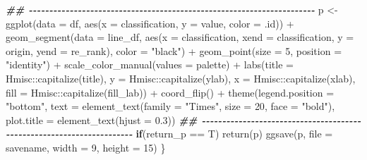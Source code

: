 \documentclass[
]{article}
\newenvironment{Shaded}{\begin{snugshade}}{\end{snugshade}}
\newcommand{\AttributeTok}[1]{\textcolor[rgb]{0.77,0.63,0.00}{#1}}
\newcommand{\ControlFlowTok}[1]{\textcolor[rgb]{0.13,0.29,0.53}{\textbf{#1}}}
\newcommand{\DecValTok}[1]{\textcolor[rgb]{0.00,0.00,0.81}{#1}}
\newcommand{\DocumentationTok}[1]{\textcolor[rgb]{0.56,0.35,0.01}{\textbf{\textit{#1}}}}
\newcommand{\FloatTok}[1]{\textcolor[rgb]{0.00,0.00,0.81}{#1}}
\newcommand{\FunctionTok}[1]{\textcolor[rgb]{0.00,0.00,0.00}{#1}}
\newcommand{\NormalTok}[1]{#1}
\newcommand{\OtherTok}[1]{\textcolor[rgb]{0.56,0.35,0.01}{#1}}
\newcommand{\SpecialCharTok}[1]{\textcolor[rgb]{0.00,0.00,0.00}{#1}}
\newcommand{\StringTok}[1]{\textcolor[rgb]{0.31,0.60,0.02}{#1}}
\begin{document}
\begin{Shaded}
\begin{Highlighting}[]
    \DocumentationTok{\#\# {-}{-}{-}{-}{-}{-}{-}{-}{-}{-}{-}{-}{-}{-}{-}{-}{-}{-}{-}{-}{-}{-}{-}{-}{-}{-}{-}{-}{-}{-}{-}{-}{-}{-}{-}{-}{-}{-}{-}{-}{-}{-}{-}{-}{-}{-}{-}{-}{-}{-}{-}{-}{-}{-}{-}{-}{-}{-}{-}{-}{-}{-}{-}{-}{-}{-}{-}{-}{-}{-} }
\NormalTok{    p }\OtherTok{\textless{}{-}} \FunctionTok{ggplot}\NormalTok{(}\AttributeTok{data =}\NormalTok{ df,}
                \FunctionTok{aes}\NormalTok{(}\AttributeTok{x =}\NormalTok{ classification,}
                    \AttributeTok{y =}\NormalTok{ value,}
                    \AttributeTok{color =}\NormalTok{ .id)) }\SpecialCharTok{+}
      \FunctionTok{geom\_segment}\NormalTok{(}\AttributeTok{data =}\NormalTok{ line\_df, }\FunctionTok{aes}\NormalTok{(}\AttributeTok{x =}\NormalTok{ classification, }\AttributeTok{xend =}\NormalTok{ classification, }\AttributeTok{y =}\NormalTok{ origin, }\AttributeTok{yend =}\NormalTok{ re\_rank),}
                   \AttributeTok{color =} \StringTok{"black"}\NormalTok{) }\SpecialCharTok{+}
      \FunctionTok{geom\_point}\NormalTok{(}\AttributeTok{size =} \DecValTok{5}\NormalTok{,}
                 \AttributeTok{position =} \StringTok{"identity"}\NormalTok{) }\SpecialCharTok{+}
      \FunctionTok{scale\_color\_manual}\NormalTok{(}\AttributeTok{values =}\NormalTok{ palette) }\SpecialCharTok{+}
      \FunctionTok{labs}\NormalTok{(}\AttributeTok{title =}\NormalTok{ Hmisc}\SpecialCharTok{::}\FunctionTok{capitalize}\NormalTok{(title),}
           \AttributeTok{y =}\NormalTok{ Hmisc}\SpecialCharTok{::}\FunctionTok{capitalize}\NormalTok{(ylab),}
           \AttributeTok{x =}\NormalTok{ Hmisc}\SpecialCharTok{::}\FunctionTok{capitalize}\NormalTok{(xlab),}
           \AttributeTok{fill =}\NormalTok{ Hmisc}\SpecialCharTok{::}\FunctionTok{capitalize}\NormalTok{(fill\_lab)) }\SpecialCharTok{+}
      \FunctionTok{coord\_flip}\NormalTok{() }\SpecialCharTok{+}
      \FunctionTok{theme}\NormalTok{(}\AttributeTok{legend.position =} \StringTok{"bottom"}\NormalTok{,}
            \AttributeTok{text =} \FunctionTok{element\_text}\NormalTok{(}\AttributeTok{family =} \StringTok{"Times"}\NormalTok{, }\AttributeTok{size =} \DecValTok{20}\NormalTok{, }\AttributeTok{face =} \StringTok{"bold"}\NormalTok{),}
            \AttributeTok{plot.title =} \FunctionTok{element\_text}\NormalTok{(}\AttributeTok{hjust =} \FloatTok{0.3}\NormalTok{))}
      \DocumentationTok{\#\# {-}{-}{-}{-}{-}{-}{-}{-}{-}{-}{-}{-}{-}{-}{-}{-}{-}{-}{-}{-}{-}{-}{-}{-}{-}{-}{-}{-}{-}{-}{-}{-}{-}{-}{-}{-}{-}{-}{-}{-}{-}{-}{-}{-}{-}{-}{-}{-}{-}{-}{-}{-}{-}{-}{-}{-}{-}{-}{-}{-}{-}{-}{-}{-}{-}{-}{-}{-}{-}{-} }
      \ControlFlowTok{if}\NormalTok{(return\_p }\SpecialCharTok{==}\NormalTok{ T)}
        \FunctionTok{return}\NormalTok{(p)}
      \FunctionTok{ggsave}\NormalTok{(p, }\AttributeTok{file =}\NormalTok{ savename, }\AttributeTok{width =} \DecValTok{9}\NormalTok{, }\AttributeTok{height =} \DecValTok{15}\NormalTok{)}
\NormalTok{  \}}
\end{Highlighting}
\end{Shaded}
\end{document}
